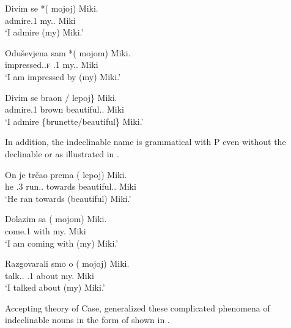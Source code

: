 \documentclass[output=paper,colorlinks,citecolor=brown,newtxmath]{langsci/langscibook}
\begin{document}
\begin{exe}
\ex\label{SCmy}
\begin{xlist}
\ex
\gll	Divim se *(\hspace{-2pt} mojoj) Miki.\\
		admire.1{\SG} {\REFL} {} my.{\DAT.\SG} Miki\\
\trans	`I admire (my) Miki.'

\ex
\gll	Oduševjena sam *(\hspace{-2pt} mojom) Miki.\\
		impressed.{\SG}.\textsc{f} {\AUX}.1{\SG} {} my.{\INS}.{\SG} Miki\\
\trans	`I am impressed by (my) Miki.'

\ex
\gll	Divim se \minsp{\{*} braon / lepoj\} Miki.\\
		admire.1{\SG} {\REFL} {} brown {} beautiful.{\DAT}.{\SG} Miki\\
\trans	`I admire \{brunette/beautiful\} Miki.'
\hfill\citep[121]{Horvath2014}
\end{xlist}
\end{exe}

\noindent
In addition, the indeclinable name is grammatical with P even without the declinable  or  as illustrated in .


\begin{exe}
\ex\label{SCprep}
\begin{xlist}
\ex
\gll	On je trčao prema (\hspace{-2pt} lepoj) Miki.\\
		he {\AUX}.3{\SG} run.{\PTCP}.{\SG} towards {} beautiful.{\DAT.\SG} Miki\\
\trans	`He ran towards (beautiful) Miki.'

\ex
\gll	Dolazim sa (\hspace{-2pt} mojom) Miki.\\
		come.{1\SG} with {} my.{\INS} Miki\\
\trans	`I am coming with (my) Miki.'

\ex
\gll	Razgovarali smo o (\hspace{-2pt} mojoj) Miki.\\
		talk.{\PTCP.\PL} {\AUX.1\PL} about {} my.{\LOC} Miki\\
\trans	`I talked about (my) Miki.'
\hfill\citep[122--123]{Horvath2014}
\end{xlist}
\end{exe}

\noindent Accepting  theory of Case, \cite{Horvath2014} generalized these complicated phenomena of    indeclinable nouns in the form of  shown in .
\end{document}
